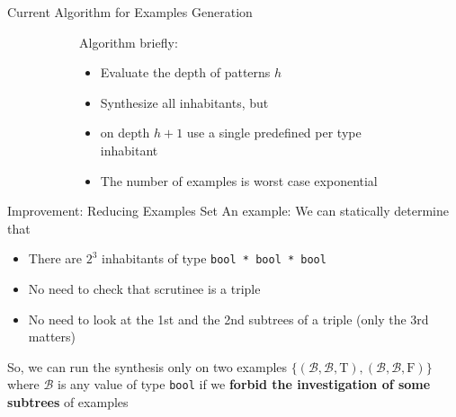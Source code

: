 \documentclass[aspectratio=169
  , xcolor={svgnames}
  , hyperref={ colorlinks,citecolor=Blue
             , linkcolor=DarkRed,urlcolor=DarkBlue}
  , russian
  ]{beamer}
\begin{document}
\begin{frame}{Current Algorithm for Examples Generation}
\begin{figure}
\begin{subfigure}[b]{0.75\linewidth}
Algorithm briefly:
\begin{itemize}
\item Evaluate the depth of patterns $h$
\item Synthesize all inhabitants, but
\item on depth $h+1$ use a single predefined per type inhabitant 
\end{itemize}
\vspace{1cm}

\begin{itemize}
\item[\faBad] The number of examples is  worst case exponential
\end{itemize}
\end{subfigure}
\hspace{.5cm}
\begin{subfigure}[b]{0.45\linewidth}
\end{subfigure}
\end{figure}

\end{frame}


\begin{frame}{Improvement: Reducing Examples Set}
An example:
\improvementA
\vspace{1em}
We can statically determine that 

\begin{itemize}
\item There are $2^3$ inhabitants of type \lstinline=bool * bool * bool=
\item No need to  check that scrutinee is a triple
\item No need to look at the 1st and  the 2nd subtrees of a triple (only the 3rd matters)
\end{itemize}
\vspace{.5cm}


So, we can run the synthesis only on two examples $\{(\mathcal{B},\mathcal{B},\text{T}),(\mathcal{B},\mathcal{B},\text{F})\}$
where $\mathcal{B}$ is any value of type \lstinline=bool=
if we \textbf{forbid the investigation of  some subtrees} of examples
\end{frame}
\end{document}
